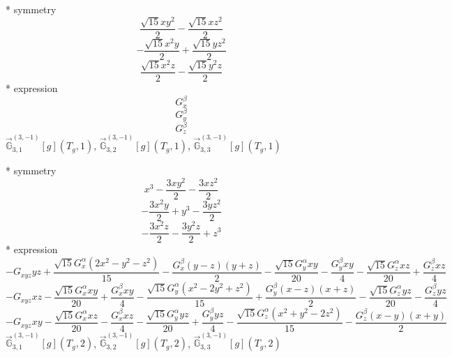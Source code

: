 \documentclass[fleqn,8pt]{jsarticle}
\begin{document}
\noindent\quad ** symmetry
\begin{dmath*}
\frac{\sqrt{15} x y^{2}}{2} - \frac{\sqrt{15} x z^{2}}{2}
\end{dmath*}
\begin{dmath*}
- \frac{\sqrt{15} x^{2} y}{2} + \frac{\sqrt{15} y z^{2}}{2}
\end{dmath*}
\begin{dmath*}
\frac{\sqrt{15} x^{2} z}{2} - \frac{\sqrt{15} y^{2} z}{2}
\end{dmath*}
\noindent\quad ** expression
\begin{dmath*}
G_{x}^{\beta}
\end{dmath*}
\begin{dmath*}
G_{y}^{\beta}
\end{dmath*}
\begin{dmath*}
G_{z}^{\beta}
\end{dmath*}
\noindent\quad $\vec{\mathbb{G}}_{3,1}^{(3,-1)}[g](T_{g},1)$, $\vec{\mathbb{G}}_{3,2}^{(3,-1)}[g](T_{g},1)$, $\vec{\mathbb{G}}_{3,3}^{(3,-1)}[g](T_{g},1)$

\noindent\quad ** symmetry
\begin{dmath*}
x^{3} - \frac{3 x y^{2}}{2} - \frac{3 x z^{2}}{2}
\end{dmath*}
\begin{dmath*}
- \frac{3 x^{2} y}{2} + y^{3} - \frac{3 y z^{2}}{2}
\end{dmath*}
\begin{dmath*}
- \frac{3 x^{2} z}{2} - \frac{3 y^{2} z}{2} + z^{3}
\end{dmath*}
\noindent\quad ** expression
\begin{dmath*}
- G_{xyz} y z + \frac{\sqrt{15} G_{x}^{\alpha} \left(2 x^{2} - y^{2} - z^{2}\right)}{15} - \frac{G_{x}^{\beta} \left(y - z\right) \left(y + z\right)}{2} - \frac{\sqrt{15} G_{y}^{\alpha} x y}{20} - \frac{G_{y}^{\beta} x y}{4} - \frac{\sqrt{15} G_{z}^{\alpha} x z}{20} + \frac{G_{z}^{\beta} x z}{4}
\end{dmath*}
\begin{dmath*}
- G_{xyz} x z - \frac{\sqrt{15} G_{x}^{\alpha} x y}{20} + \frac{G_{x}^{\beta} x y}{4} - \frac{\sqrt{15} G_{y}^{\alpha} \left(x^{2} - 2 y^{2} + z^{2}\right)}{15} + \frac{G_{y}^{\beta} \left(x - z\right) \left(x + z\right)}{2} - \frac{\sqrt{15} G_{z}^{\alpha} y z}{20} - \frac{G_{z}^{\beta} y z}{4}
\end{dmath*}
\begin{dmath*}
- G_{xyz} x y - \frac{\sqrt{15} G_{x}^{\alpha} x z}{20} - \frac{G_{x}^{\beta} x z}{4} - \frac{\sqrt{15} G_{y}^{\alpha} y z}{20} + \frac{G_{y}^{\beta} y z}{4} - \frac{\sqrt{15} G_{z}^{\alpha} \left(x^{2} + y^{2} - 2 z^{2}\right)}{15} - \frac{G_{z}^{\beta} \left(x - y\right) \left(x + y\right)}{2}
\end{dmath*}
\noindent\quad $\vec{\mathbb{G}}_{3,1}^{(3,-1)}[g](T_{g},2)$, $\vec{\mathbb{G}}_{3,2}^{(3,-1)}[g](T_{g},2)$, $\vec{\mathbb{G}}_{3,3}^{(3,-1)}[g](T_{g},2)$
\end{document}
